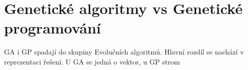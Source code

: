 \section{Genetické algoritmy vs Genetické programování}

 GA i GP spadají do skupiny Evolučních algoritmů.
Hlavní rozdíl se nachází v reprezentaci řešení. U GA se jedná o vektor, u GP strom
